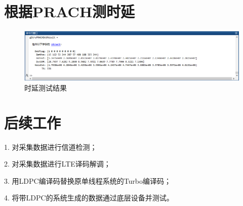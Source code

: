 \documentclass{article}
\begin{document}
\section{根据PRACH测时延}
\begin{figure}[H]
	\centering
	\includegraphics[width = \textwidth]{prach.png}
	\caption{时延测试结果}
\end{figure}

\section{后续工作}
1. 对采集数据进行信道检测；

2. 对采集数据进行LTE译码解调；

3. 用LDPC编译码替换原单线程系统的Turbo编译码；

4. 将带LDPC的系统生成的数据通过底层设备并测试。

\end{document}
